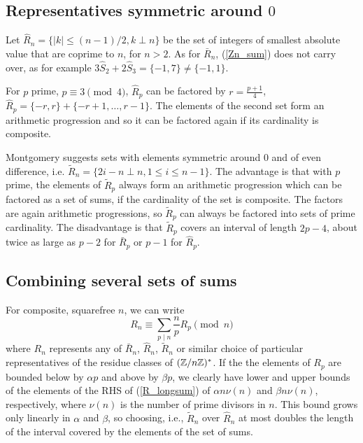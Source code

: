 \documentclass{article}
\begin{document}
\subsection{Representatives symmetric around $0$}
Let $\hat{R}_n = \{|k| \leq (n-1)/2, k \perp n\}$ be the 
set of integers of smallest absolute value that are coprime to $n$, 
for $n > 2$. As for $\bar{R}_n$, (\ref{Zn_sum}) does not carry over, 
as for example $3\hat{S}_2 + 2\hat{S}_3 = \{-1,7\} \neq \{-1,1\}$.


For $p$ prime, $p \equiv 3 \pmod{4}$, $\hat{R}_p$ can be factored by 
$r=\frac{p+1}{4}$, $\hat{R}_p = \{ -r, r\} + \{-r+1, \ldots, r-1\}$.
The elements of the second set form an arithmetic progression and 
so it can be factored again if its cardinality is composite.

\pagebreak[1]

Montgomery suggests sets with elements symmetric around $0$ and of
even difference, i.e. $\tilde{R}_n = \{2i-n \perp n, 1\leq i \leq n-1 \}$. 
The advantage is that with $p$ prime, the elements of $\tilde{R}_p$ always 
form an arithmetic progression which can be factored as a set of sums, if 
the cardinality of the set is composite. 
The factors are again arithmetic progressions, so $\tilde{R}_p$ 
can always be factored into sets of prime cardinality.
The disadvantage is that $\tilde{R}_p$ covers an interval of length 
$2p-4$, about twice as large as $p-2$ for $\bar{R}_p$ or $p-1$ for 
$\hat{R}_p$.

\subsection{Combining several sets of sums}

For composite, squarefree $n$, we can write
\begin{equation}\label{R_longsum}
R_n \equiv \sum_{p\mid n} \frac{n}{p}R_p \pmod{n}
\end{equation}
where $R_n$ represents any of $\bar{R}_n$, $\hat{R}_n$, 
$\tilde{R}_n$ or similar choice of particular representatives of
the residue classes of $(\mathbb{Z}/{n}\mathbb{Z})^{*}$.
If the the elements of $R_p$ are bounded below by $\alpha p$ and above by 
$\beta p$, we clearly have lower and upper bounds of the elements of the RHS 
of (\ref{R_longsum}) of $\alpha n\nu(n)$ and $\beta n \nu(n)$, respectively, 
where $\nu(n)$ is the number of prime divisors in $n$. 
This bound grows only linearly in $\alpha$ and $\beta$, so choosing, i.e., 
$\tilde{R}_n$ over $\hat{R}_n$ at most doubles the length of the interval 
covered by the elements of the set of sums.
\end{document}
